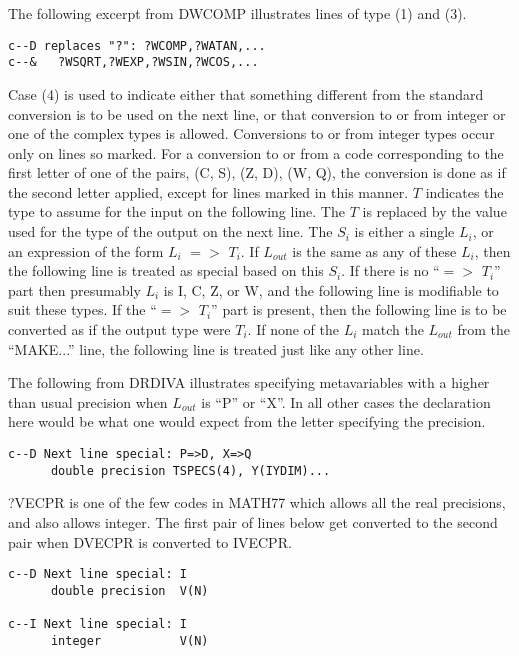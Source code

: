 \documentclass[twoside]{MATH77}
\begin{document}
The following excerpt from DWCOMP illustrates lines of type (1) and
(3).

\begin{verbatim}
c--D replaces "?": ?WCOMP,?WATAN,...
c--&   ?WSQRT,?WEXP,?WSIN,?WCOS,...
\end{verbatim}

Case (4) is used to indicate either that something different from the
standard conversion is to be used on the next line, or that
conversion to or from integer or one of the complex types is allowed.
Conversions to or from integer types occur only on lines so marked.
For a conversion to or from a code corresponding to the first letter
of one of the pairs, (C, S), (Z, D), (W, Q), the conversion is done
as if the second letter applied, except for lines marked in this
manner.  $T$ indicates the type to assume for the input on the
following line. The $T$ is replaced by the value used for the type of
the output on the next line.  The $S_i$ is either a single $L_i$, or
an expression of the form $L_i$ $=>$ $T_i$. If $L_{out}$ is the same
as any of these $L_i$, then the following line is treated as special
based on this $S_i$.  If there is no ``$=>$ $T_i$'' part then
presumably $L_i$ is I, C, Z, or W, and the following line is
modifiable to suit these types.  If the ``$=>$ $T_i$'' part is
present, then the following line is to be converted as if the output
type were $T_i$.  If none of the $L_i$ match the $L_{out}$ from the
``MAKE...'' line, the following line is treated just like any other
line.

The following from DRDIVA illustrates specifying metavariables with a
higher than usual precision when $L_{out}$ is ``P'' or ``X''.  In all
other cases the declaration here would be what one would expect
from the letter specifying the precision.

\begin{verbatim}
c--D Next line special: P=>D, X=>Q
      double precision TSPECS(4), Y(IYDIM)...
\end{verbatim}

?VECPR is one of the few codes in MATH77 which allows all the real
precisions, and also allows integer.  The first pair of lines below
get converted to the second pair when DVECPR is converted to IVECPR.

\begin{verbatim}
c--D Next line special: I
      double precision  V(N)

c--I Next line special: I
      integer           V(N)
\end{verbatim}
\end{document}
